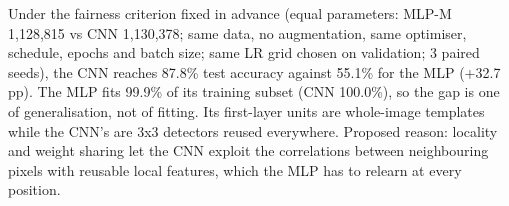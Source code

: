 Under the fairness criterion fixed in advance (equal parameters: MLP-M 1,128,815 vs CNN 1,130,378; same data, no augmentation, same optimiser, schedule, epochs and batch size; same LR grid chosen on validation; 3 paired seeds), the CNN reaches 87.8\% test accuracy against 55.1\% for the MLP (+32.7 pp). The MLP fits 99.9\% of its training subset (CNN 100.0\%), so the gap is one of generalisation, not of fitting. Its first-layer units are whole-image templates while the CNN's are 3x3 detectors reused everywhere. Proposed reason: locality and weight sharing let the CNN exploit the correlations between neighbouring pixels with reusable local features, which the MLP has to relearn at every position.
